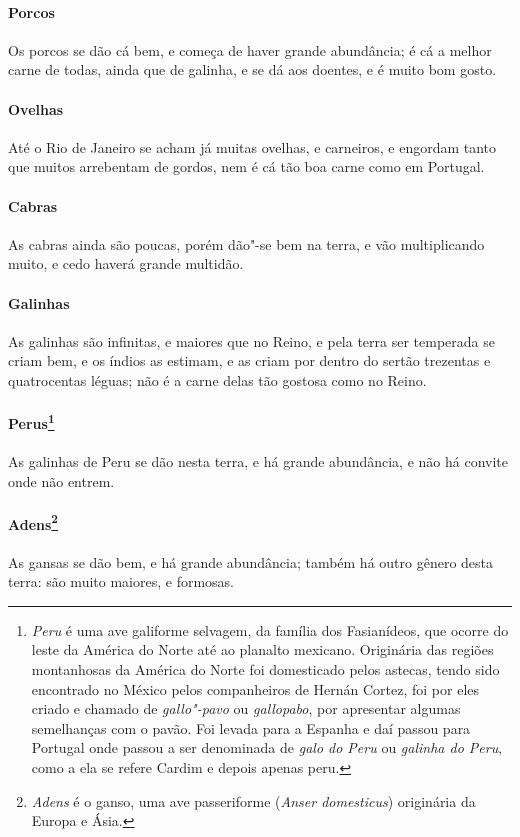 \paragraph{Porcos} Os porcos se dão cá bem, e começa de haver grande
abundância; é cá a melhor carne de todas, ainda que de galinha, e se dá
aos doentes, e é muito bom gosto.

\paragraph{Ovelhas} Até o Rio de Janeiro se acham já muitas ovelhas, e
carneiros, e engordam tanto que muitos arrebentam de gordos, nem é cá
tão boa carne como em Portugal.

\paragraph{Cabras} As cabras ainda são poucas, porém dão"-se bem na
terra, e vão multiplicando muito, e cedo haverá grande multidão.

\paragraph{Galinhas} As galinhas são infinitas, e maiores que no Reino,
e pela terra ser temperada se criam bem, e os índios as estimam, e as
criam por dentro do sertão trezentas e quatrocentas léguas; não é a
carne delas tão gostosa como no Reino.

\paragraph{Perus\footnote{ \textit{Peru} é uma ave galiforme selvagem,
da família dos Fasianídeos, que ocorre do leste da América do Norte até
ao planalto mexicano. Originária das regiões montanhosas da América do
Norte foi domesticado pelos astecas, tendo sido encontrado no México
pelos companheiros de Hernán Cortez, foi por eles criado e chamado de
\textit{gallo"-pavo} ou \textit{gallopabo}, por apresentar algumas
semelhanças com o pavão. Foi levada para a Espanha e daí passou para
Portugal onde passou a ser denominada de \textit{galo do Peru} ou
\textit{galinha do Peru}, como a ela se refere Cardim e depois apenas
peru.}} As galinhas de Peru se dão nesta terra, e há grande
abundância, e não há convite onde não entrem.

\paragraph{Adens\footnote{ \textit{Adens} é o ganso, uma ave
passeriforme (\textit{Anser domesticus}) originária da Europa e
Ásia.}} As gansas se dão bem, e há grande abundância; também
há outro gênero desta terra: são muito maiores, e formosas.

